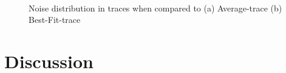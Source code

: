 \documentclass[10pt]{article}
\begin{document}
\begin{figure}[h!]
\centering
{}\\
\caption{Noise distribution in traces when compared to (a) Average-trace (b) Best-Fit-trace}
\label{fig:noises_components}
\end{figure}

\pagebreak



\pagebreak


\section{Discussion}
\end{document}

